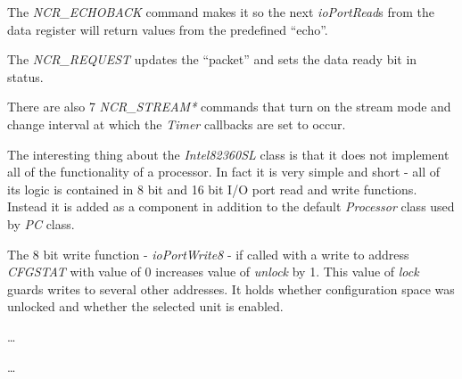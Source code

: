 The \emph{NCR\_ECHOBACK} command makes it so the next \emph{ioPortRead}s from
the data register will return values from the predefined ``echo''.

\begin{codeblock}
    
\end{codeblock}

The \emph{NCR\_REQUEST} updates the ``packet'' and sets the data ready bit in
status.

\begin{codeblock}
    
\end{codeblock}

There are also 7 \emph{NCR\_STREAM*} commands that turn on the stream mode and
change interval at which the \emph{Timer} callbacks are set to occur.

\begin{codeblock}
    
\end{codeblock}


The interesting thing about the \emph{Intel82360SL} class is that it does not
implement all of the functionality of a processor. In fact it is very simple
and short - all of its logic is contained in 8 bit and 16 bit I/O port read and
write functions. Instead it is added as a component in addition to the default
\emph{Processor} class used by \emph{PC} class.

The 8 bit write function - \emph{ioPortWrite8} - if called with a write to
address \emph{CFGSTAT} with value of 0 increases value of \emph{unlock} by 1.
This value of \emph{lock} guards writes to several other addresses. It holds
whether configuration space was unlocked and whether the selected unit is
enabled. 

\begin{codeblock}
    
    \dots
    
    \dots
    
\end{codeblock}

